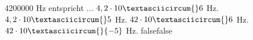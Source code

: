     {4200000 Hz entspricht ...}
    {$4,2\cdot 10\textasciicircum{}6$ Hz.}
    {$4,2\cdot 10\textasciicircum{}5$ Hz.}
    {$42\cdot 10\textasciicircum{}6$ Hz.}
    {$42\cdot 10\textasciicircum{}\{-5\}$ Hz.}
    {false}{false}